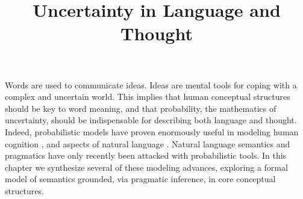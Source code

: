 \documentclass[12pt]{article}
\title{Uncertainty in Language and Thought}
\begin{document}
\listoftodos
\pagebreak


\maketitle

\abstract{}




\tableofcontents

\pagebreak



Words are used to communicate ideas. Ideas are mental tools for coping with a complex and uncertain world. This implies that human conceptual structures should be key to word meaning, and that probability, the mathematics of uncertainty, should be indispensable for describing both language and thought. Indeed, probabilistic models have proven enormously useful in modeling human cognition \cite{Tenenbaum, etc}, and aspects of natural language \cite{ChaterManning}. Natural language semantics and pragmatics have only recently been attacked with probabilistic tools. In this chapter we synthesize several of these modeling advances, exploring a formal model of semantics grounded, via pragmatic inference, in core conceptual structures.



%
\end{document}
